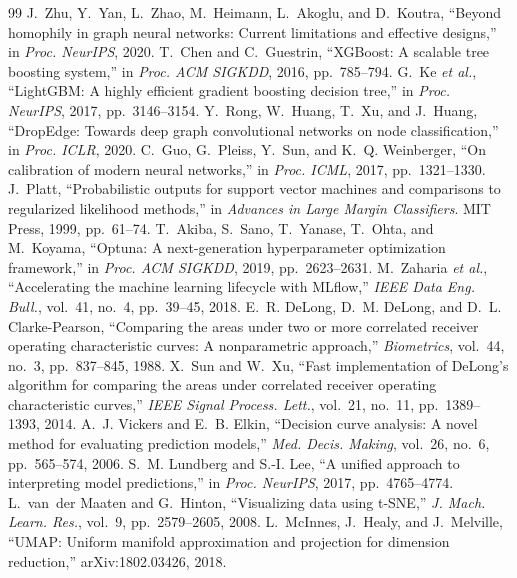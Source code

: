 \documentclass[conference]{IEEEtran}
\begin{document}
\begin{thebibliography}{99}
 J.~Zhu, Y.~Yan, L.~Zhao, M.~Heimann, L.~Akoglu, and D.~Koutra, ``Beyond homophily in graph neural networks: Current limitations and effective designs,'' in \emph{Proc. NeurIPS}, 2020.
 T.~Chen and C.~Guestrin, ``XGBoost: A scalable tree boosting system,'' in \emph{Proc. ACM SIGKDD}, 2016, pp.~785--794.
 G.~Ke \emph{et al.}, ``LightGBM: A highly efficient gradient boosting decision tree,'' in \emph{Proc. NeurIPS}, 2017, pp.~3146--3154.
 Y.~Rong, W.~Huang, T.~Xu, and J.~Huang, ``DropEdge: Towards deep graph convolutional networks on node classification,'' in \emph{Proc. ICLR}, 2020.
 C.~Guo, G.~Pleiss, Y.~Sun, and K.~Q. Weinberger, ``On calibration of modern neural networks,'' in \emph{Proc. ICML}, 2017, pp.~1321--1330.
 J.~Platt, ``Probabilistic outputs for support vector machines and comparisons to regularized likelihood methods,'' in \emph{Advances in Large Margin Classifiers}. MIT Press, 1999, pp.~61--74.
 T.~Akiba, S.~Sano, T.~Yanase, T.~Ohta, and M.~Koyama, ``Optuna: A next-generation hyperparameter optimization framework,'' in \emph{Proc. ACM SIGKDD}, 2019, pp.~2623--2631.
 M.~Zaharia \emph{et al.}, ``Accelerating the machine learning lifecycle with MLflow,'' \emph{IEEE Data Eng. Bull.}, vol.~41, no.~4, pp.~39--45, 2018.
 E.~R. DeLong, D.~M. DeLong, and D.~L. Clarke-Pearson, ``Comparing the areas under two or more correlated receiver operating characteristic curves: A nonparametric approach,'' \emph{Biometrics}, vol.~44, no.~3, pp.~837--845, 1988.
 X.~Sun and W.~Xu, ``Fast implementation of DeLong's algorithm for comparing the areas under correlated receiver operating characteristic curves,'' \emph{IEEE Signal Process. Lett.}, vol.~21, no.~11, pp.~1389--1393, 2014.
 A.~J. Vickers and E.~B. Elkin, ``Decision curve analysis: A novel method for evaluating prediction models,'' \emph{Med. Decis. Making}, vol.~26, no.~6, pp.~565--574, 2006.
 S.~M. Lundberg and S.-I. Lee, ``A unified approach to interpreting model predictions,'' in \emph{Proc. NeurIPS}, 2017, pp.~4765--4774.
 L.~van~der Maaten and G.~Hinton, ``Visualizing data using t-SNE,'' \emph{J. Mach. Learn. Res.}, vol.~9, pp.~2579--2605, 2008.
 L.~McInnes, J.~Healy, and J.~Melville, ``UMAP: Uniform manifold approximation and projection for dimension reduction,'' arXiv:1802.03426, 2018.
\end{thebibliography}
\end{document}
